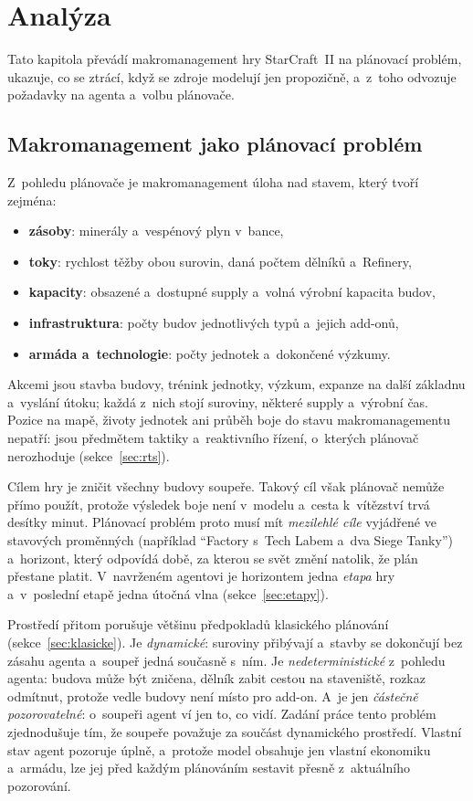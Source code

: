 \chapter{Analýza}
\label{chap:analyza}

Tato kapitola převádí makromanagement hry StarCraft~II na plánovací problém, ukazuje, co se ztrácí, když se zdroje modelují jen propozičně, a~z~toho odvozuje požadavky na agenta a~volbu plánovače.

\section{Makromanagement jako plánovací problém}
\label{sec:problem}

Z~pohledu plánovače je makromanagement úloha nad stavem, který tvoří zejména:
\begin{itemize}
	\item \textbf{zásoby}: minerály a~vespénový plyn v~bance,
	\item \textbf{toky}: rychlost těžby obou surovin, daná počtem dělníků a~Refinery,
	\item \textbf{kapacity}: obsazené a~dostupné supply a~volná výrobní kapacita budov,
	\item \textbf{infrastruktura}: počty budov jednotlivých typů a~jejich add-onů,
	\item \textbf{armáda a~technologie}: počty jednotek a~dokončené výzkumy.
\end{itemize}
Akcemi jsou stavba budovy, trénink jednotky, výzkum, expanze na další základnu a~vyslání útoku; každá z~nich stojí suroviny, některé supply a~výrobní čas. Pozice na mapě, životy jednotek ani průběh boje do stavu makromanagementu nepatří: jsou předmětem taktiky a~reaktivního řízení, o~kterých plánovač nerozhoduje (sekce~\ref{sec:rts}).

Cílem hry je zničit všechny budovy soupeře. Takový cíl však plánovač nemůže přímo použít, protože výsledek boje není v~modelu a~cesta k~vítězství trvá desítky minut. Plánovací problém proto musí mít \emph{mezilehlé cíle} vyjádřené ve stavových proměnných (například \enquote{Factory s~Tech Labem a~dva Siege Tanky}) a~horizont, který odpovídá době, za kterou se svět změní natolik, že plán přestane platit. V~navrženém agentovi je horizontem jedna \emph{etapa} hry a~v~poslední etapě jedna útočná vlna (sekce~\ref{sec:etapy}).

Prostředí přitom porušuje většinu předpokladů klasického plánování (sekce~\ref{sec:klasicke}). Je \emph{dynamické}: suroviny přibývají a~stavby se dokončují bez zásahu agenta a~soupeř jedná současně s~ním. Je \emph{nedeterministické} z~pohledu agenta: budova může být zničena, dělník zabit cestou na staveniště, rozkaz odmítnut, protože vedle budovy není místo pro add-on. A~je jen \emph{částečně pozorovatelné}: o~soupeři agent ví jen to, co vidí. Zadání práce tento problém zjednodušuje tím, že soupeře považuje za součást dynamického prostředí. Vlastní stav agent pozoruje úplně, a~protože model obsahuje jen vlastní ekonomiku a~armádu, lze jej před každým plánováním sestavit přesně z~aktuálního pozorování.

